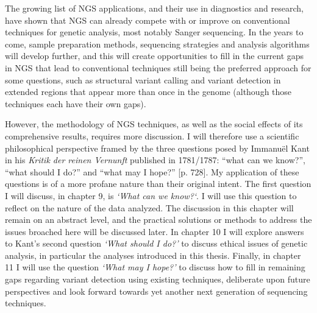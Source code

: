The growing list of NGS applications, and their use in diagnostics and research, have shown that NGS can already compete with or improve on conventional techniques for genetic analysis, most notably Sanger sequencing. 
In the years to come, sample preparation methods, sequencing strategies and analysis algorithms will develop further, and this will create opportunities to fill in the current gaps in NGS that lead to conventional techniques still being the preferred approach for some questions, such as structural variant calling and variant detection in extended regions that appear more than once in the genome (although those techniques each have their own gaps). 

However, the methodology of NGS techniques, as well as the social effects of its comprehensive results, requires more discussion. 
I will therefore use a scientific philosophical perspective framed by the three questions posed by Immanuël Kant in his \textsl{Kritik der reinen Vernunft} published in 1781/1787: “what can we know?”, “what should I do?” and “what may I hope?” \cite{Kant_1781a}[p. 728]. 
My application of these questions is of a more profane nature than their original intent. 
The first question I will discuss, in chapter 9, is \textsl{‘What can we know?‘}. 
I will use this question to reflect on the nature of the data analyzed. 
The discussion in this chapter will remain on an abstract level, and the practical solutions or methods to address the issues broached here will be discussed later. 
In chapter 10 I will explore answers to Kant’s second question \textsl{‘What should I do?’} to discuss ethical issues of genetic analysis, in particular the analyses introduced in this thesis. 
Finally, in chapter 11 I will use the question \textsl{‘What may I hope?’} to discuss how to fill in remaining gaps regarding variant detection using existing techniques, deliberate upon future perspectives and look forward towards yet another next generation of sequencing techniques.
